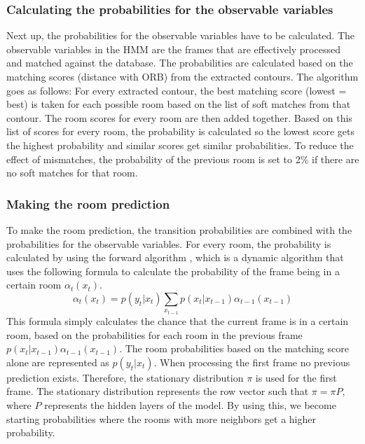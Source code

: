 
\subsubsection{Calculating the probabilities for the observable variables}
Next up,  the probabilities for the observable variables have to be calculated. The observable variables in the HMM are the frames that are effectively processed and matched against the database. The probabilities are calculated based on the matching scores (distance with ORB) from the extracted contours.
The algorithm goes as follows:
For every extracted contour, the best matching score (lowest = best) is taken for each possible room based on the list of soft matches from that contour. The room scores for every room are then added together. Based on this list of scores for every room, the probability is calculated so the lowest score gets the highest probability and similar scores get similar probabilities. To reduce the effect of mismatches, the probability of the previous room is set to 2\% if there are no soft matches for that room.
\\
\subsubsection{Making the room prediction}
To make the room prediction, the transition probabilities are combined with the probabilities for the observable variables.
For every room, the probability is calculated by using the forward algorithm \cite{blunsom2004hidden} \cite{ahmadian2018systematic}, which is a dynamic algorithm that uses the following formula to calculate the probability of the frame being in a certain room $\alpha_t(x_t)$.  \[ \alpha_t(x_t) = p(y_t|x_t) \sum_{x_{t-1}}p(x_t|x_{t-1})\alpha_{t-1}(x_{t-1}) \] 
This formula simply calculates the chance that the current frame is in a certain room, based on the probabilities for each room in the previous frame $p(x_t|x_{t-1})\alpha_{t-1}(x_{t-1})$. The room probabilities based on the matching score alone are represented as $p(y_t|x_t)$. When processing the first frame no previous prediction exists. Therefore, the stationary distribution $\pi$ is used for the first frame. The stationary distribution represents the row vector such that $\pi = \pi P$, where $P$ represents the hidden layers of the model. By using this, we become starting probabilities where the rooms with more neighbors get a higher probability.\par

